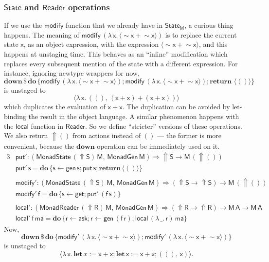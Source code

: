 \documentclass[acmsmall,screen]{acmart}
\newcommand{\mit}[1]{{\mathsf{#1}}}
\newcommand{\msf}[1]{{\mathsf{#1}}}
\newcommand{\mbf}[1]{{\mathbf{#1}}}
\newcommand{\bs}[1]{\boldsymbol{#1}}
\newcommand{\mdo}{\mbf{do}\,}
\newcommand{\return}{\mbf{return}\,}
\newcommand{\lam}{\lambda\,}
\newcommand{\M}{\msf{M}}
\newcommand{\letdef}{\mbf{let\,}}
\newcommand{\vma}{\mathsf{ma}}
\newcommand{\vA}{\mathsf{A}}
\newcommand{\vS}{\mathsf{S}}
\newcommand{\vR}{\mathsf{R}}
\newcommand{\vM}{\mathsf{M}}
\newcommand{\vx}{\mathsf{x}}
\newcommand{\vf}{\mathsf{f}}
\newcommand{\vs}{\mathsf{s}}
\newcommand{\vr}{\mathsf{r}}
\newcommand{\Reader}{\msf{Reader}}
\newcommand{\fro}{\leftarrow}
\newcommand{\Up}{{\Uparrow}}
\newcommand{\spl}{{\bs{\sim}}}
\newcommand{\ql}{{\bs{\langle}}}
\newcommand{\qr}{{\bs{\rangle}}}
\theoremstyle{remark}
\newcommand{\mdown}{\mbf{down}}
\newcommand{\gen}{\mit{gen}}
\newcommand{\qt}[1]{\ql#1\qr}
\newcommand{\MonadGen}{\msf{MonadGen}}
\newcommand{\MonadState}{\msf{MonadState}}
\newcommand{\MonadReader}{\msf{MonadReader}}
\newcommand{\RA}{\Rightarrow}
\newcommand{\dlr}{\,\$\,}
\newcommand{\State}{\msf{State}}
\newcommand{\modify}{\mit{modify}}
\newcommand{\get}{\mit{get}}
\newcommand{\mput}{\mit{put}}
\begin{document}
\subsubsection{$\State$ and $\Reader$ operations} If we use
the $\modify$ function that we already have in $\State_\M$, a curious thing
happens. The meaning of $\modify\,(\lam \vx.\,\qt{\spl \vx + \spl \vx})$ is to
replace the current state $\vx$, as an object expression, with the expression
$\qt{\spl \vx + \spl \vx}$, and this happens at unstaging time. This behaves as an
``inline'' modification which replaces every subsequent mention of the state
with a different expression. For instance, ignoring newtype wrappers for now,
\[ \mdown \dlr \mdo \{\modify\,(\lam \vx.\,\qt{\spl \vx + \spl \vx}); \modify\,(\lam \vx.\,\qt{\spl \vx + \spl \vx});\return\,\qt{()}\} \]
is unstaged to
\[ \qt{\lam \vx.\,((),\,(\vx + \vx) + (\vx + \vx))} \]
which duplicates the evaluation of $\vx + \vx$. The duplication can be avoided
by let-binding the result in the object language. A similar phenomenon happens
with the $\mit{local}$ function in $\Reader$. So we define ``stricter'' versions
of these operations. We also return $\Up ()$ from actions instead of $()$ ---
the former is more convenient, because the $\mdown$ operation can be immediately
used on it.
\begingroup
\allowdisplaybreaks
\begin{alignat*}{3}
  & \mput' : (\MonadState\,(\Up \vS)\,\vM,\,\MonadGen\,\vM) \RA \Up \vS \to \vM\,(\Up ()) \\
  & \mput'\,\vs = \mdo \{\vs \fro \gen\,\vs; \mput\,\vs; \return \qt{()}\}\\
  &\\
  & \modify' : (\MonadState\,(\Up \vS)\,\vM,\,\MonadGen\,\vM) \RA (\Up \vS \to \Up \vS) \to \vM\,(\Up ()) \\
  & \modify'\,\vf = \mdo \{\vs \fro \get; \mput'\,(\vf\,\vs)\}\\
  &\\
  & \mit{local'} : (\MonadReader\,(\Up \vR)\,\vM,\,\MonadGen\,\vM) \RA (\Up \vR \to \Up \vR) \to \vM\,\vA \to \vM\,\vA\\
  & \mit{local'}\,\vf\,\vma = \mdo \{\vr \fro \mit{ask}; \vr \fro \gen\,(\vf\,\vr);\mit{local}\,(\lam \_.\,\vr)\,\vma\}
\end{alignat*}
\endgroup
Now,
\[ \mdown \dlr \mdo \{\modify'\,(\lam \vx.\,\qt{\spl \vx + \spl \vx}); \modify'\,(\lam \vx.\,\qt{\spl \vx + \spl \vx})\} \]
is unstaged to
\[ \qt{\lam \vx.\,\letdef x := \vx + \vx; \letdef \vx := \vx + \vx; ((),\,\vx)}. \]
\end{document}
